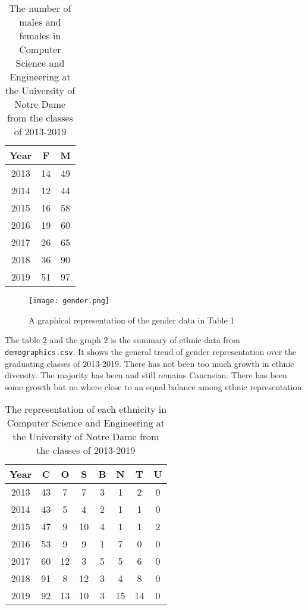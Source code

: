\documentclass[letterpaper]{article}
\begin{document}
\begin{table}[ht]

\centering
 \begin{tabular}{||c c c||} 
 \hline
  Year & F & M \\ [0.5ex] 
 \hline\hline
 2013 & 14 & 49  \\ 
 \hline
 2014 & 12 & 44 \\
 \hline
 2015 & 16 & 58 \\
 \hline
 2016 & 19 & 60 \\
 \hline
 2017 & 26 & 65 \\ 
 \hline
 2018 & 36 & 90 \\ 
 \hline
 2019 & 51 & 97 \\ 
 \hline
\end{tabular}
\caption{The number of males and females in Computer Science and Engineering at the University of Notre Dame from the classes of 2013-2019}
\label{table:1}
\end{table}

\begin{figure}[h]
    \texttt{[image: gender.png]}
    \centering
    \caption{A graphical representation of the gender data in Table 1}
\end{figure}        


The table \ref{table:2}  and the graph 2 is the summary of ethnic data from {\tt demographics.csv}. It shows the general trend of gender representation over the graduating classes of 2013-2019. There has not been too much growth in ethnic diversity. The majority has been and still remains Caucasian. There has been some growth but no where close to an equal balance among ethnic representation. 

\begin{table}[h!]
\centering
 \begin{tabular}{|c c c c c c c c |} 
 \hline
  Year & C & O & S & B & N & T & U \\
 \hline\hline
 2013 & 43 & 7 & 7 & 3 & 1 & 2 & 0  \\ 
 \hline
 2014 & 43 & 5 & 4 & 2 & 1 & 1 & 0 \\
 \hline
 2015 & 47 & 9 & 10 & 4 & 1 & 1 & 2\\
 \hline
 2016 & 53 & 9 & 9 & 1 & 7 & 0 & 0 \\
 \hline
 2017 & 60 & 12 & 3 & 5 & 5 & 6 & 0 \\ 
 \hline
 2018 & 91 & 8 & 12 & 3 & 4 & 8 & 0 \\ 
 \hline
 2019 & 92 & 13 & 10 & 3 & 15 & 14 & 0 \\ 
 \hline
\end{tabular}
\caption{The representation of each ethnicity in Computer Science and Engineering at the University of Notre Dame from the classes of 2013-2019}
\label{table:2}
\end{table}  
\end{document}
